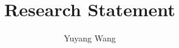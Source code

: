 



\title{Research Statement}

\author{Yuyang Wang}
\date{\vspace{-1em}}
\makeatletter
\fancyfoot[L]{\scshape \MakeLowercase{\@author}}
\fancyfoot[R]{{\scshape \MakeLowercase{\@title}}\quad{\LARGE\sfrac{\thepage}{\pageref*{LastPage}}}}
\makeatother



\maketitle%
\thispagestyle{fancy}


% 

\scriptsize


